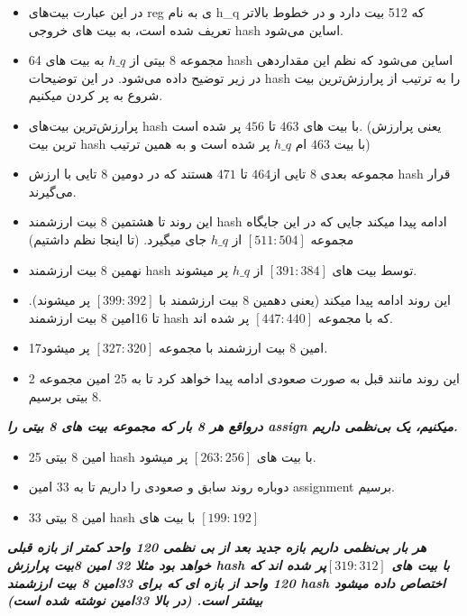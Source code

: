 \begin{itemize}
	\item
	      در این عبارت بیت‌های reg ی به نام
	      h\_q 
	      که 512 بیت دارد و در خطوط بالاتر تعریف شده است، به بیت های خروجی hash اساین می‌شود.
	\item
	      64 مجموعه 8 بیتی از $h\_q$ به بیت های hash اساین می‌شود که نظم این مقداردهی در زیر توضیح داده می‌شود. در این توضیحات hash را به ترتیب از پرارزش‌ترین بیت شروع به پر کردن میکنیم.
	\item
	      پرارزش‌ترین بیت‌های hash با بیت های $463$ تا $456$ پر شده است. (یعنی پرارزش ترین بیت hash با بیت $463$ ام $h\_q$ پر شده است و به همین ترتیب)
	\item
	      مجموعه بعدی 8 تایی از$464$ تا $471$ هستند که در دومین 8 تایی با ارزش hash قرار می‌گیرند.
	\item
	      این روند تا هشتمین 8 بیت ارزشمند hash ادامه پیدا میکند جایی که در این جایگاه مجموعه $[511:504]$ از $h\_q$ جای میگیرد. (تا اینجا نظم داشتیم)
	\item
	      نهمین 8 بیت ارزشمند hash توسط بیت های $[391:384]$ از $h\_q$ پر میشوند.
	\item
	      این روند ادامه پیدا میکند (یعنی دهمین 8 بیت ارزشمند با $[399:392]$ پر میشوند).
	      تا 16امین 8 بیت ارزشمند hash که با مجموعه $[447:440]$ پر شده اند.
	\item
	      17امین 8 بیت ارزشمند با مجموعه $[327:320]$ پر میشود.
	\item2
	      این روند مانند قبل به صورت صعودی ادامه پیدا خواهد کرد تا به 25 امین مجموعه 8 بیتی برسیم.
	      
\end{itemize}

\textit{\textbf{درواقع هر 8 بار که مجموعه بیت های 8 بیتی را assign میکنیم، یک بی‌نظمی داریم.
}}
\begin{itemize}
	\item
	      25 امین 8 بیتی hash با بیت های $[263:256]$ پر میشود.
	\item
	      دوباره روند سابق و صعودی را داریم تا به 33 امین assignment برسیم.
	\item
	      33 امین 8 بیتی hash با بیت های $[199:192]$
	      
\end{itemize}

\textit{\textbf{هر بار بی‌نظمی داریم بازه جدید بعد از بی نظمی 120 واحد کمتر از بازه قبلی خواهد بود مثلا 32 امین 8بیت پرارزش hash با بیت های $[319:312] $پر شده اند که 120 واحد از بازه ای که برای 33امین 8 بیت ارزشمند hash اختصاص داده میشود بیشتر است. (در بالا 33امین نوشته شده است)}}

